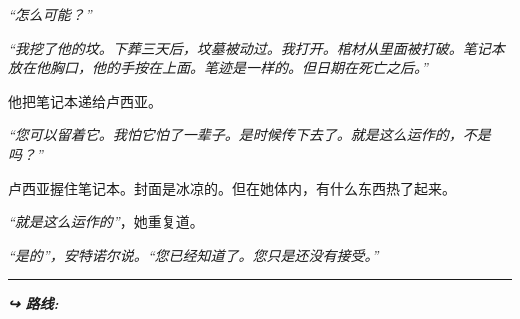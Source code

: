 \noindent \textit{\textquotedblleft{}怎么可能？\textquotedblright{}}

\noindent \textit{\textquotedblleft{}我挖了他的坟。下葬三天后，坟墓被动过。我打开。棺材从里面被打破。笔记本放在他胸口，他的手按在上面。笔迹是一样的。但日期在死亡之后。\textquotedblright{}}

\noindent 他把笔记本递给卢西亚。

\noindent \textit{\textquotedblleft{}您可以留着它。我怕它怕了一辈子。是时候传下去了。就是这么运作的，不是吗？\textquotedblright{}}

\noindent 卢西亚握住笔记本。封面是冰凉的。但在她体内，有什么东西热了起来。

\noindent \textit{\textquotedblleft{}就是这么运作的\textquotedblright{}}，她重复道。

\noindent \textit{\textquotedblleft{}是的\textquotedblright{}，安特诺尔说。\textquotedblleft{}您已经知道了。您只是还没有接受。\textquotedblright{}}

\vspace{0.5em}\noindent\rule{\textwidth}{0.5pt}\vspace{0.5em}

\vspace{0.5em}
\noindent\textit{\textbf{↪ 路线:}  \rotasep {}}
